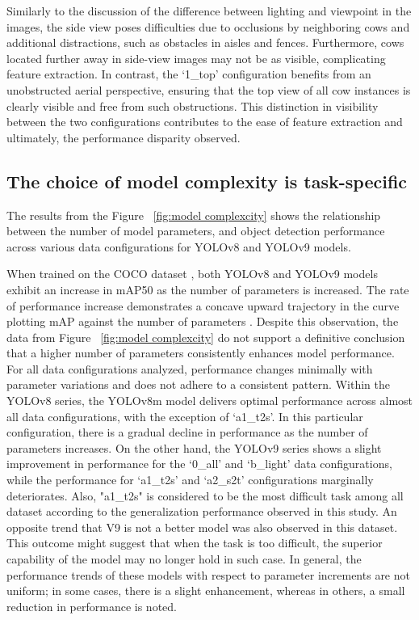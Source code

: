Similarly to the discussion of the difference between lighting and viewpoint in the images, the side view poses difficulties due to occlusions by neighboring cows and additional distractions, such as obstacles in aisles and fences. Furthermore, cows located further away in side-view images may not be as visible, complicating feature extraction. In contrast, the `1\_top' configuration benefits from an unobstructed aerial perspective, ensuring that the top view of all cow instances is clearly visible and free from such obstructions. This distinction in visibility between the two configurations contributes to the ease of feature extraction and ultimately, the performance disparity observed.

\subsection{The choice of model complexity is task-specific}

The results from the Figure ~\ref{fig:model complexcity} shows the relationship between the number of model parameters, and object detection performance across various data configurations for YOLOv8 and YOLOv9 models. 

When trained on the COCO dataset \cite{lin2014microsoft}, both YOLOv8 and YOLOv9 models exhibit an increase in mAP50 as the number of parameters is increased. The rate of performance increase demonstrates a concave upward trajectory in the curve plotting mAP against the number of parameters \cite{ultralyticsYOLOv8,wang2024yolov9}. Despite this observation, the data from Figure ~\ref{fig:model complexcity} do not support a definitive conclusion that a higher number of parameters consistently enhances model performance. For all data configurations analyzed, performance changes minimally with parameter variations and does not adhere to a consistent pattern. Within the YOLOv8 series, the YOLOv8m model delivers optimal performance across almost all data configurations, with the exception of `a1\_t2s'. In this particular configuration, there is a gradual decline in performance as the number of parameters increases. On the other hand, the YOLOv9 series shows a slight improvement in performance for the `0\_all' and `b\_light' data configurations, while the performance for `a1\_t2s' and `a2\_s2t' configurations marginally deteriorates. Also, "a1\_t2s" is considered to be the most difficult task among all dataset according to the generalization performance observed in this study. An opposite trend that V9 is not a better model was also observed in this dataset. This outcome might suggest that when the task is too difficult, the superior capability of the model may no longer hold in such case. In general, the performance trends of these models with respect to parameter increments are not uniform; in some cases, there is a slight enhancement, whereas in others, a small reduction in performance is noted.

